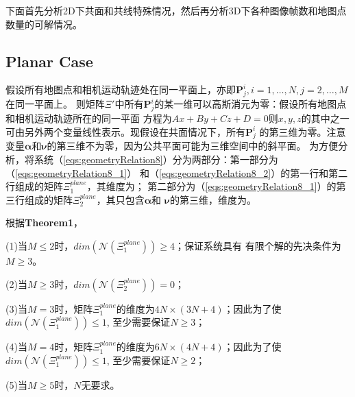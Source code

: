 \documentclass{article}
\begin{document}
下面首先分析2D下共面和共线特殊情况，然后再分析3D下各种图像帧数和地图点数量的可解情况。
\subsection{Planar Case}
假设所有地图点和相机运动轨迹处在同一平面上，亦即$\textbf{P}_j^i,i=1,\dots,N,j=2,\dots,M$在同一平面上。
则矩阵$\Xi'$中所有$\textbf{P}_j^i$的某一维可以高斯消元为零：假设所有地图点和相机运动轨迹所在的同一平面
方程为$Ax+By+Cz+D=0$则$x,y,z$的其中之一可由另外两个变量线性表示。现假设在共面情况下，所有$\textbf{P}_j^i$
的第三维为零。注意变量$\mathbf{\alpha}$和$\mathbf{\nu}$的第三维不为零，因为公共平面可能为三维空间中的斜平面。
为方便分析，将系统（\ref{eqs:geometryRelation8}）分为两部分：第一部分为（\ref{eqs:geometryRelation8_1}）
和（\ref{eqs:geometryRelation8_2}）的第一行和第二行组成的矩阵$\Xi_1^{plane}$，其维度为{\color{red}{$2(M-1)N\times (MN+4)$}}；
第二部分为（\ref{eqs:geometryRelation8_1}）的第三行组成的矩阵$\Xi_2^{plane}$，其只包含$\mathbf{\alpha}$和
$\mathbf{\nu}$的第三维，维度为{\color{red}{$(M-1)\times 2$}}。
\par
根据\textbf{Theorem1}，
\par
(1)当$M\leqslant 2$时，$dim(\mathcal{N}(\Xi_1^{plane}))\geqslant 4$；保证系统具有
有限个解的先决条件为$M\geqslant 3$。
\par
(2)当$M\geqslant 3$时，$dim(\mathcal{N}(\Xi_2^{plane}))=0$；
\par
(3)当$M=3$时，矩阵$\Xi_1^{plane}$的维度为$4N\times (3N+4)$；因此为了使$dim(\mathcal{N}(\Xi_1^{plane}))\leqslant 1$,
至少需要保证$N\geqslant 3$；
\par
(4)当$M=4$时，矩阵$\Xi_1^{plane}$的维度为$6N\times (4N+4)$；因此为了使$dim(\mathcal{N}(\Xi_1^{plane}))\leqslant 1$,
至少需要保证$N\geqslant 2$；
\par
(5)当$M\geqslant 5$时，$N$无要求。
\end{document}

